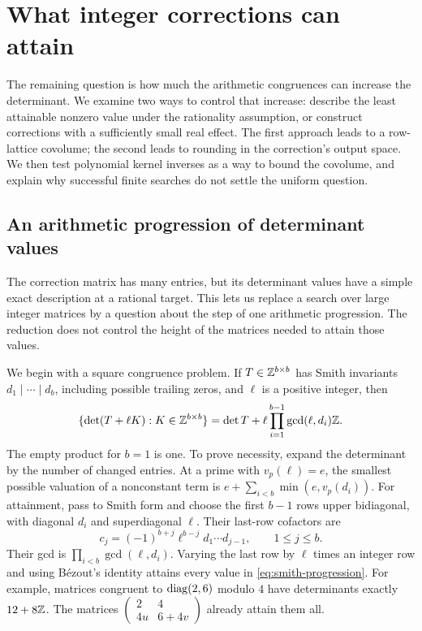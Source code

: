 \section{What integer corrections can attain}\label{sec:corrections}

The remaining question is how much the arithmetic congruences can
increase the determinant. We examine two ways to control that increase:
describe the least attainable nonzero value under the rationality
assumption, or construct corrections with a sufficiently small real
effect. The first approach leads to a row-lattice covolume; the second
leads to rounding in the correction's output space. We then test
polynomial kernel inverses as a way to bound the covolume, and explain
why successful finite searches do not settle the uniform question.

\subsection{An arithmetic progression of determinant values}

The correction matrix has many entries, but its determinant values
have a simple exact description at a rational target. This lets us
replace a search over large integer matrices by a question about the
step of one arithmetic progression. The reduction does not control
the height of the matrices needed to attain those values.

We begin with a square congruence problem. If $T\in\mathbb Z^{b\times b}$
has Smith invariants $d_1\mid\cdots\mid d_b$, including possible
trailing zeros, and $\ell$ is a positive integer, then
\begin{equation}\label{eq:smith-progression}
 \{\det(T+\ell K):K\in\mathbb Z^{b\times b}\}
 =\det T+\ell\prod_{i=1}^{b-1}\gcd(\ell,d_i)\mathbb Z.
\end{equation}
The empty product for $b=1$ is one. To prove necessity, expand the
determinant by the number of changed entries. At a prime with
$v_p(\ell)=e$, the smallest possible valuation of a nonconstant term
is $e+\sum_{i<b}\min(e,v_p(d_i))$.
For attainment, pass to Smith form and choose the first $b-1$ rows
upper bidiagonal, with diagonal $d_i$ and superdiagonal $\ell$.
Their last-row cofactors are
\[
 c_j=(-1)^{b+j}\ell^{b-j}d_1\cdots d_{j-1},\qquad 1\le j\le b.
\]
Their gcd is $\prod_{i<b}\gcd(\ell,d_i)$. Varying the last row by
$\ell$ times an integer row and using B\'ezout's identity attains
every value in \eqref{eq:smith-progression}.
For example, matrices congruent to $\operatorname{diag}(2,6)$ modulo $4$ have
determinants exactly $12+8\mathbb Z$. The matrices
$\left(\begin{smallmatrix}2&4\\4u&6+4v\end{smallmatrix}\right)$
already attain them all.

